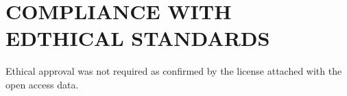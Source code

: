 \documentclass[letterpaper, 10 pt, conference]{ieeeconf}  %
\begin{document}
\section{COMPLIANCE WITH EDTHICAL STANDARDS}
\label{sec:ethics}
Ethical approval was not required as confirmed by the license attached with the open access data\cite{ben2022teeth3ds}.







%
 
\end{document}
